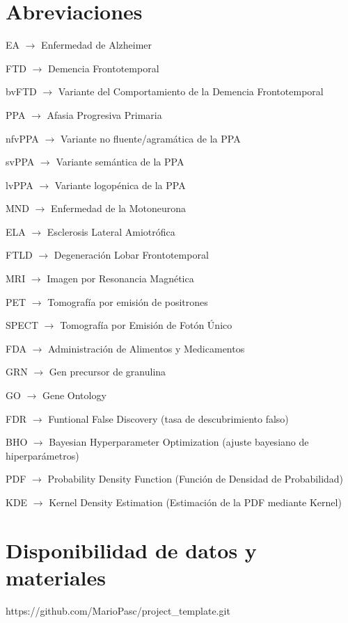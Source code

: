 \documentclass{bmcart}
\begin{document}
	\begin{backmatter}
	
		\section*{Abreviaciones}%
			EA $\rightarrow$ Enfermedad de Alzheimer
		
			FTD $\rightarrow$ Demencia Frontotemporal
			
			bvFTD $\rightarrow$ Variante del Comportamiento de la Demencia Frontotemporal
			
			PPA $\rightarrow$ Afasia Progresiva Primaria
			
			nfvPPA $\rightarrow$ Variante no fluente/agramática de la PPA
			
			svPPA $\rightarrow$ Variante semántica de la PPA
			
			lvPPA $\rightarrow$ Variante logopénica de la PPA
			
			MND $\rightarrow$ Enfermedad de la Motoneurona
			
			ELA $\rightarrow$ Esclerosis Lateral Amiotrófica
			
			FTLD $\rightarrow$ Degeneración Lobar Frontotemporal
			
			MRI $\rightarrow$ Imagen por Resonancia Magnética
			
			PET $\rightarrow$ Tomografía por emisión de positrones
			
			SPECT $\rightarrow$ Tomografía por Emisión de Fotón Único
			
			FDA $\rightarrow$ Administración de Alimentos y Medicamentos
			
			GRN $\rightarrow$ Gen precursor de granulina
			
			GO $\rightarrow$ Gene Ontology
			
			FDR $\rightarrow$ Funtional False Discovery (tasa de descubrimiento falso)
			
			BHO $\rightarrow$ Bayesian Hyperparameter Optimization (ajuste bayesiano de hiperparámetros)	
			
			PDF $\rightarrow$ Probability Density Function (Función de Densidad de Probabilidad)
			
			KDE $\rightarrow$ Kernel Density Estimation (Estimación de la PDF mediante Kernel)
		
		\section*{Disponibilidad de datos y materiales}%
			https://github.com/MarioPasc/project\_template.git
		

\end{backmatter}
\end{document}

